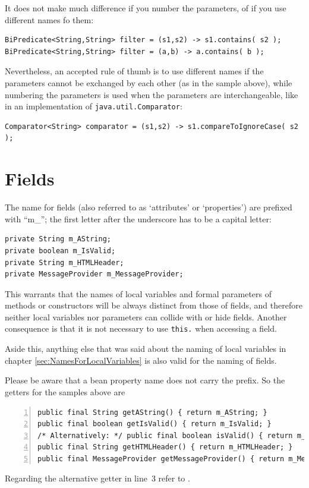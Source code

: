 \documentclass[12pt,a4paper,titlepage, parskip=half, headsepline, footsepline, cleardoubleplain]{scrbook}
\newcommand*{\tqref}[1]{\hyperref[{#1}]{\ref*{#1}}}
\begin{document}
It does not make much difference if you number the parameters, of if you use different names fo them:
\begin{lstlisting}
BiPredicate<String,String> filter = (s1,s2) -> s1.contains( s2 );
BiPredicate<String,String> filter = (a,b) -> a.contains( b );
\end{lstlisting}

Nevertheless, an accepted rule of thumb is to use different names if the parameters cannot be exchanged by each other (as in the sample above), while numbering the parameters is used when the parameters are interchangeable, like in an implementation of \lstinline|java.util.Comparator|:
\begin{lstlisting}
Comparator<String> comparator = (s1,s2) -> s1.compareToIgnoreCase( s2 );
\end{lstlisting}

\section{Fields}\label{sec:Fields}
The name for fields (also referred to as ‘attributes’ or ‘properties’) are prefixed with “m\_”; the first letter after the underscore has to be a capital letter:
\begin{lstlisting}
private String m_AString;
private boolean m_IsValid;
private String m_HTMLHeader;
private MessageProvider m_MessageProvider;
\end{lstlisting}
This warrants that the names of local variables and formal parameters of methods or constructors will be always distinct from those of fields, and therefore neither local variables nor parameters can collide with or hide fields. Another consequence is that it is not necessary to use \lstinline|this.| when accessing a field.

Aside this, anything else that was said about the naming of local variables in chapter \tqref{sec:NamesForLocalVariables} is also valid for the naming of fields.

Please be aware that a bean property name does not carry the prefix. So the getters for the samples above are
\begin{lstlisting}[numbers=left]
public final String getAString() { return m_AString; }
public final boolean getIsValid() { return m_IsValid; }
/* Alternatively: */ public final boolean isValid() { return m_IsValid; }
public final String getHTMLHeader() { return m_HTMLHeader; }
public final MessageProvider getMessageProvider() { return m_MessageProvider; }
\end{lstlisting}
Regarding the alternative getter in line~3 refer to \autocite{ORACLE_DOC_JAVABEANS:Chapter8_3_2}.
\end{document}
